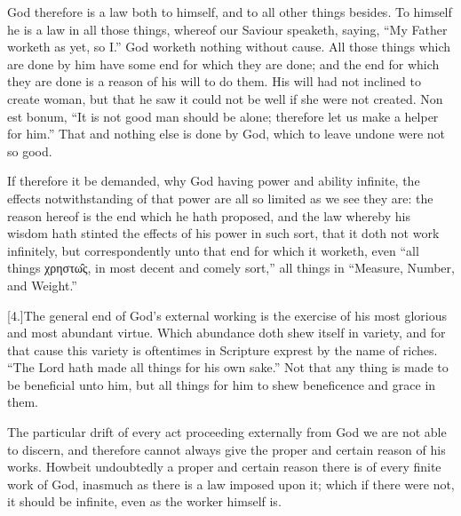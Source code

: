 God therefore is a law both to himself, and to all other things besides. To himself he is a law in all those things, whereof our Saviour speaketh, saying, “My Father worketh as yet, so I.” God worketh nothing without cause. All those things which are done by him have some end for which they are done; and the end for which they are done is a reason of his will to do them. His will had not inclined to create woman, but that he saw it could not be well if she were not created. Non est bonum, “It is not good man should be alone; therefore let us make a helper for him.” That and nothing else is done by God, which to leave undone were not so good.

If therefore it be demanded, why God having power and ability infinite, the effects notwithstanding of that power are all so limited as we see they are: the reason hereof is the end which he hath proposed, and the law whereby his wisdom hath stinted the effects of his power in such sort, that it doth not work infinitely, but correspondently unto that end for which it worketh, even “all things χρηστω̑ς,  in most decent and comely sort,” all things in “Measure, Number, and Weight.”

[4.]The general end of God’s external working is the exercise of his most glorious and most abundant virtue. Which abundance doth shew itself in variety, and for that cause this variety is oftentimes in Scripture exprest by the name of riches. “The Lord hath made all things for his own sake.” Not that any thing is made to be beneficial unto him, but all things for him to shew beneficence and grace in them.

The particular drift of every act proceeding externally from God we are not able to discern, and therefore cannot always give the proper and certain reason of his works. Howbeit undoubtedly a proper and certain reason there is of every finite work of God, inasmuch as there is a law imposed upon it; which if there were not, it should be infinite, even as the worker himself is.

